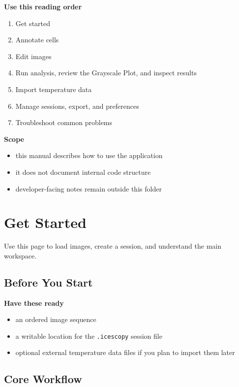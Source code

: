 \documentclass[
  9pt,
  letterpaper,
  oneside,
  open=any,
  DIV=15,
  parskip=half-,
  headings=big,
  numbers=noenddot
]{scrbook}
\newcommand{\manuallead}[1]{%
  \vspace{0.15em}%
  {\sffamily\bfseries\color{ManualBlue}#1}\par\nobreak\vspace{0.05em}%
}
\begin{document}
\manuallead{Use this reading order}

\begin{enumerate}[leftmargin=*,itemsep=0.35em,topsep=0.4em]
\item Get started
\item Annotate cells
\item Edit images
\item Run analysis, review the Grayscale Plot, and inspect results
\item Import temperature data
\item Manage sessions, export, and preferences
\item Troubleshoot common problems
\end{enumerate}

\manuallead{Scope}

\begin{itemize}[leftmargin=*,itemsep=0.35em,topsep=0.4em]
\item this manual describes how to use the application
\item it does not document internal code structure
\item developer-facing notes remain outside this folder
\end{itemize}

\mainmatter
\chapter{Get Started}

Use this page to load images, create a session, and understand the main workspace.


\section{Before You Start}

\manuallead{Have these ready}

\begin{itemize}[leftmargin=*,itemsep=0.35em,topsep=0.4em]
\item an ordered image sequence
\item a writable location for the \texttt{.icescopy} session file
\item optional external temperature data files if you plan to import them later
\end{itemize}

\section{Core Workflow}
\end{document}

